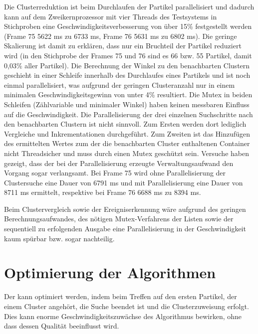 Die Clusterreduktion ist beim Durchlaufen der Partikel parallelisiert und dadurch kann auf dem Zweikernprozessor mit vier Threads des Testsystems in Stichproben eine Geschwindigkeitsverbesserung von über 15\% festgestellt werden (Frame 75 5622 \gls{ms} zu 6733 \gls{ms}, Frame 76 5631 \gls{ms} zu 6802 \gls{ms}). Die geringe Skalierung ist damit zu erklären, dass nur ein Bruchteil der Partikel reduziert wird (in den Stichprobe der Frames 75 und 76 sind es 66 bzw. 55 Partikel, damit 0,03\% aller Partikel). Die Berechnung der Winkel zu den benachbarten Clustern geschieht in einer Schleife innerhalb des Durchlaufes eines Partikels und ist noch einmal parallelisiert, was aufgrund der geringen Clusteranzahl nur in einem minimalen Geschwindigkeitsgewinn von unter 4\% resultiert. Die Mutex in beiden Schleifen (Zählvariable und minimaler Winkel) haben keinen messbaren Einfluss auf die Geschwindigkeit.
Die Parallelisierung der drei einzelnen Suchschritte nach den benachbarten Clustern ist nicht sinnvoll. Zum Ersten werden dort lediglich Vergleiche und Inkrementationen durchgeführt. Zum Zweiten ist das Hinzufügen des ermittelten Wertes zum der die benachbarten Cluster enthaltenen Container nicht Threadsicher und muss durch einen Mutex geschützt sein. Versuche haben gezeigt, dass der bei der Parallelisierung erzeugte Verwaltungsaufwand den Vorgang sogar verlangsamt. Bei Frame 75 wird ohne Parallelisierung der Clustersuche eine Dauer von 6791 \gls{ms} und mit Parallelisierung eine Dauer von 8711 \gls{ms} ermittelt, respektive bei Frame 76 6688 \gls{ms} zu 8394 \gls{ms}.

Beim Clustervergleich sowie der Ereigniserkennung wäre aufgrund des geringen Berechnungsaufwandes, des nötigen Mutex-Verfahrens der Listen sowie der sequentiell zu erfolgenden Ausgabe eine Parallelisierung in der Geschwindigkeit kaum spürbar bzw. sogar nachteilig.



\section{Optimierung der Algorithmen}\label{sec:disc:optimierungAlg}
Der \CFD kann optimiert werden, indem beim Treffen auf den ersten Partikel, der einem Cluster angehört, die Suche beendet ist und die Clusterzuweisung erfolgt. Dies kann enorme Geschwindigkeitszuwächse des Algorithmus bewirken, ohne dass dessen Qualität beeinflusst wird.

